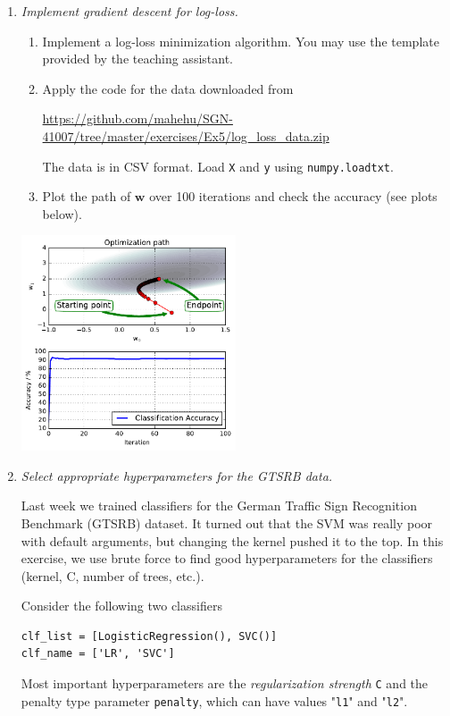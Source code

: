 \documentclass[a4paper,12pt]{scrartcl}
\newcommand{\w}{\mathbf{ w}}
\newcommand{\python}{{\fbox{\texttt{\bfseries python}}\quad}}
\begin{document}
\begin{enumerate}
\item \python \emph{Implement gradient descent for log-loss.}

\begin{enumerate}
\item Implement a log-loss minimization algorithm. You may use the template provided by the
teaching assistant.
\item Apply the code for the data downloaded from

\url{https://github.com/mahehu/SGN-41007/tree/master/exercises/Ex5/log_loss_data.zip}

The data is in CSV format. Load  \verb+X+ and \verb+y+ using \verb+numpy.loadtxt+.

\item Plot the path of $\w$ over 100 iterations and check the accuracy (see plots below).

\end{enumerate}

\centerline{\includegraphics[width=0.5\textwidth]{log_loss_minimization.pdf}}

\item \python \emph{Select appropriate hyperparameters for the GTSRB data.}

Last week we trained classifiers for the German Traffic Sign
Recognition Benchmark (GTSRB) dataset. It turned out that the SVM was
really poor with default arguments, but changing the kernel pushed it
to the top. In this exercise, we use brute force to find good hyperparameters
for the classifiers (kernel, C, number of trees, etc.).

Consider the following two classifiers
	\begin{verbatim}
clf_list = [LogisticRegression(), SVC()]
clf_name = ['LR', 'SVC']
	\end{verbatim}
	Most important hyperparameters are the \emph{regularization strength} \verb+C+ and
	the penalty type parameter \verb+penalty+, which can have values "\verb+l1+" and "\verb+l2+".
	

\end{enumerate}
\end{document}
